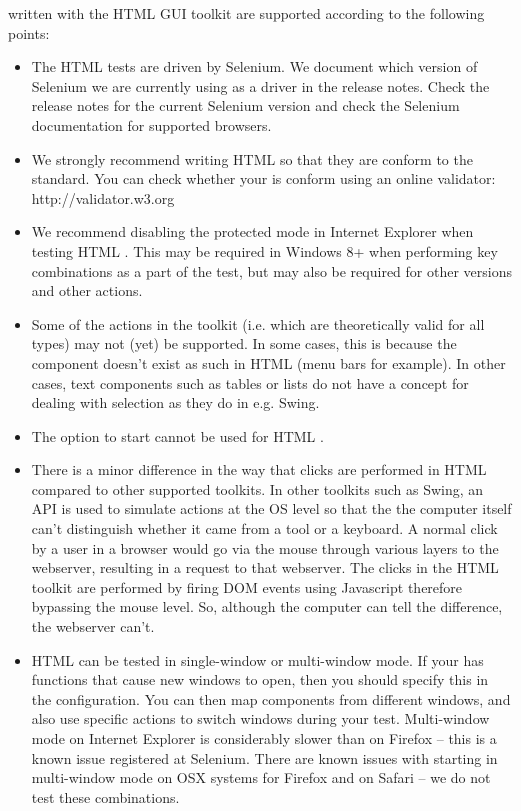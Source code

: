 \gdauts{} written with the HTML GUI toolkit are supported according to the following points:

\begin{itemize}
\item The HTML tests are driven by Selenium. We document which version of Selenium we are currently using  as a driver in the release notes. Check the release notes for the current Selenium version and check the Selenium documentation for supported browsers. 
\item We strongly recommend writing HTML \gdauts{} so that they are conform to the  standard. You can check whether your \gdaut{} is  conform using an online validator: http://validator.w3.org
\item We recommend disabling the protected mode in Internet Explorer when testing HTML \gdauts{}. This may be required in Windows 8+ when performing key combinations as a part of the test, but may also be required for other versions and other actions. 
\item Some of the  actions in the  toolkit (i.e. which are theoretically valid for all \gdaut{} types) may not (yet) be supported. In some cases, this is because the component doesn't exist as such in HTML \gdauts{} (menu bars for example). In other cases, text components such as tables or lists do not have a concept for dealing with selection as they do in e.g. Swing. 
\item The  option to start \gdauts{}  cannot be used for HTML \gdauts{}. 
\item There is a minor difference in the way that clicks are performed in HTML compared to other supported toolkits. In other toolkits such as Swing, an API is used to simulate actions at the OS level so that the the computer itself can't distinguish whether it came from a tool or a keyboard. A normal click by a user in a browser would go via the mouse through various layers to the webserver, resulting in a request to that webserver. The clicks in the HTML toolkit are performed by firing DOM events using Javascript therefore bypassing the mouse level. So, although the computer can tell the difference, the webserver can't. 
\item HTML \gdauts{} can be tested in single-window or multi-window mode. If your \gdaut{} has functions that cause new windows to open, then you should specify this in the \gdaut{} configuration. You can then map components from different windows, and also use specific actions to switch windows during your test. Multi-window mode on Internet Explorer is considerably slower than on Firefox -- this is a known issue registered at Selenium. There are known issues with \gdaut{} starting in multi-window mode on OSX systems for Firefox and on Safari -- we do not test these combinations.
\end{itemize}

